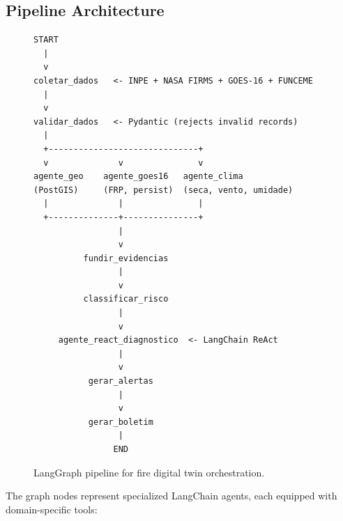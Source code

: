 \documentclass[11pt,twocolumn,a4paper]{article}
\begin{document}
\subsection{Pipeline Architecture}

\begin{figure}[htbp]
\centering
\caption{LangGraph pipeline for fire digital twin orchestration.}
\label{fig:pipeline}
\small
\begin{minipage}{0.88\columnwidth}
\small
\begin{verbatim}
START
  |
  v
coletar_dados   <- INPE + NASA FIRMS + GOES-16 + FUNCEME
  |
  v
validar_dados   <- Pydantic (rejects invalid records)
  |
  +------------------------------+
  v              v               v
agente_geo    agente_goes16   agente_clima
(PostGIS)     (FRP, persist)  (seca, vento, umidade)
  |              |               |
  +--------------+---------------+
                 |
                 v
          fundir_evidencias
                 |
                 v
          classificar_risco
                 |
                 v
     agente_react_diagnostico  <- LangChain ReAct
                 |
                 v
           gerar_alertas
                 |
                 v
           gerar_boletim
                 |
                END
\end{verbatim}
\end{minipage}
\end{figure}

The graph nodes represent specialized LangChain agents, each equipped with domain-specific tools:
\end{document}
